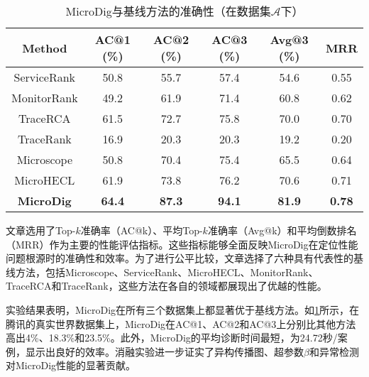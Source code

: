 \begin{table}[ht]
    \centering
    \caption{MicroDig与基线方法的准确性（在数据集$\mathcal{A}$下）}
    \label{table:the accuracy of microdig and the baseline methods A}
    \begin{tabular}{cccccc}
        \toprule
        \textbf{Method} & \textbf{AC@1 (\%)} & \textbf{AC@2 (\%)} & \textbf{AC@3 (\%)} & \textbf{Avg@3 (\%)} & \textbf{MRR} \\
        \midrule
        ServiceRank         & 50.8 & 55.7 & 57.4 & 54.6 & 0.55 \\
        MonitorRank         & 49.2 & 61.9 & 71.4 & 60.8 & 0.62 \\
        TraceRCA            & 61.5 & 72.7 & 75.8 & 70.0 & 0.70 \\
        TraceRank           & 16.9 & 20.3 & 20.3 & 19.2 & 0.20 \\
        Microscope          & 50.8 & 70.4 & 75.4 & 65.5 & 0.64 \\
        MicroHECL           & 61.9 & 73.8 & 76.2 & 70.6 & 0.71 \\
        \textbf{MicroDig}   & \textbf{64.4} & \textbf{87.3} & \textbf{94.1} & \textbf{81.9} & \textbf{0.78} \\
        \bottomrule
    \end{tabular}
\end{table}

文章选用了Top-$k$准确率（AC@k）、平均Top-$k$准确率（Avg@k）和平均倒数排名（MRR）作为主要的性能评估指标。这些指标能够全面反映MicroDig在定位性能问题根源时的准确性和效率。为了进行公平比较，文章选择了六种具有代表性的基线方法，包括Microscope、ServiceRank、MicroHECL、MonitorRank、TraceRCA和TraceRank，这些方法在各自的领域都展现出了优越的性能。

实验结果表明，MicroDig在所有三个数据集上都显著优于基线方法。如\cref{table:the accuracy of microdig and the baseline methods A}所示，在腾讯的真实世界数据集上，MicroDig在AC@1、AC@2和AC@3上分别比其他方法高出4\%、18.3\%和23.5\%。此外，MicroDig的平均诊断时间最短，为24.72秒/案例，显示出良好的效率。消融实验进一步证实了异构传播图、超参数$\beta$和异常检测对MicroDig性能的显著贡献。